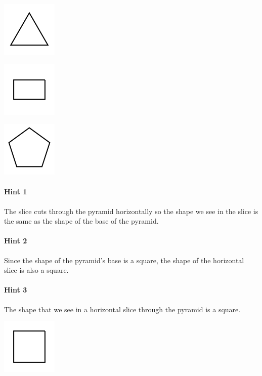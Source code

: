 \documentclass[twocolumn,10pt]{article}
\def\shrinkfactor{0.4}
\begin{document}
 
\includegraphics[scale=\shrinkfactor]{figures/15c855a8a232e6c1873c5f46769050a9c13051b8.png}


\includegraphics[scale=\shrinkfactor]{figures/0e5042b475e0847d67b74c0482f8e8173f798656.png}


\includegraphics[scale=\shrinkfactor]{figures/498a6b09730fdba2360826c138eeee142e8cccc1.png}



\paragraph{Hint 1}The slice cuts through the pyramid horizontally so the shape we see in the slice is the same as the shape of the base of the pyramid.

\paragraph{Hint 2}Since the shape of the pyramid's base is a square, the shape of the horizontal slice is also a square.

\paragraph{Hint 3}The shape that we see in a horizontal slice through the pyramid is a square.  

\includegraphics[scale=\shrinkfactor]{figures/4b59a0ece6acc7c19c389e1de534d1df93bf1169.png}
\end{document}
